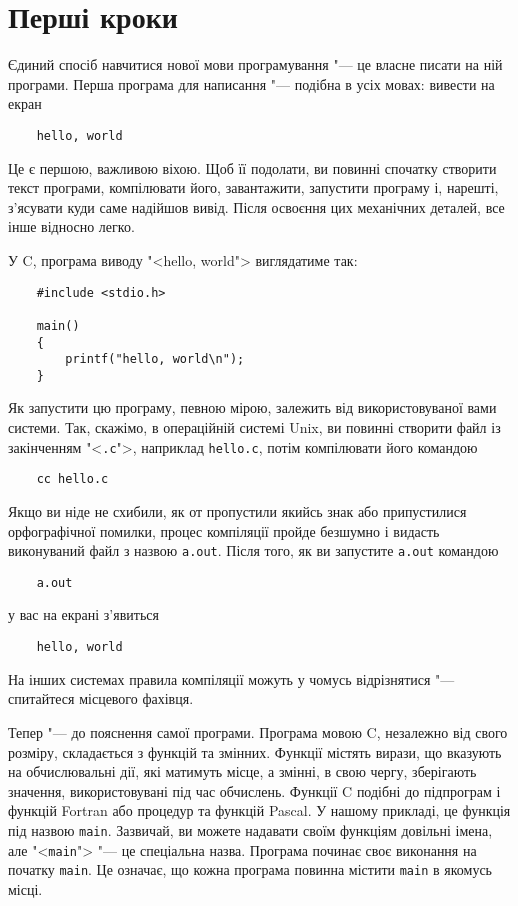 \documentclass[a4paper,12pt]{book}
\begin{document}
\section{Перші кроки}

  Єдиний спосіб навчитися нової мови програмування "--- це власне писати на ній програми.
  Перша програма для написання "--- подібна в усіх мовах: вивести на екран
  \begin{verbatim}
    hello, world
  \end{verbatim}

  Це є першою, важливою віхою. Щоб її подолати, ви повинні спочатку створити текст
  програми, компілювати його, завантажити, запустити програму і, нарешті, з'ясувати
  куди саме надійшов вивід. Після освоєння цих механічних деталей, все інше відносно
  легко.

  У C, програма виводу "<hello, world"> виглядатиме так:
  \begin{verbatim}
    #include <stdio.h>

    main()
    {
        printf("hello, world\n");
    }
  \end{verbatim}

  Як запустити цю програму, певною мірою, залежить від використовуваної вами системи.
  Так, скажімо, в операційній системі Unix, ви повинні створити файл із закінченням
  "<\texttt{.c}">, наприклад \texttt{hello.c}, потім компілювати його командою
  \begin{verbatim}
    cc hello.c
  \end{verbatim}

  Якщо ви ніде не схибили, як от пропустили якийсь знак або припустилися орфографічної
  помилки, процес компіляції пройде безшумно і видасть виконуваний файл з назвою
  \texttt{a.out}. Після того, як ви запустите \texttt{a.out} командою
  \begin{verbatim}
    a.out
  \end{verbatim}
  у вас на екрані з'явиться
  \begin{verbatim}
    hello, world
  \end{verbatim}

  На інших системах правила компіляції можуть у чомусь відрізнятися "--- спитайтеся
  місцевого фахівця.

  Тепер "--- до пояснення самої програми. Програма мовою C, незалежно від свого
  розміру, складається з функцій та змінних. Функції містять вирази, що вказують на
  обчислювальні дії, які матимуть місце, а змінні, в свою чергу, зберігають значення,
  використовувані під час обчислень. Функції C подібні до підпрограм і функцій Fortran або
  процедур та функцій Pascal. У нашому прикладі, це функція під назвою \texttt{main}.
  Зазвичай, ви можете надавати своїм функціям довільні імена, але
  "<\texttt{main}"> "--- це спеціальна назва. Програма починає своє виконання
  на початку \texttt{main}. Це означає, що кожна програма повинна містити \texttt{main} в
  якомусь місці.
\end{document}
